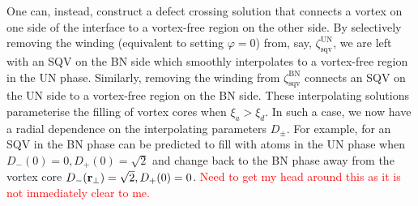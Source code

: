 One can, instead, construct a defect crossing solution that connects a vortex
on one side of the interface to a vortex-free region on the other side.
By selectively removing the winding (equivalent to setting \(\varphi=0\)) from,
say, \(\zeta^\text{UN}_\text{sqv}\), we are left with an SQV on the BN side
which smoothly interpolates to a vortex-free region in the UN phase.
Similarly, removing the winding from \(\zeta^\text{BN}_\text{sqv}\) connects an
SQV on the UN side to a vortex-free region on the BN side.
These interpolating solutions parameterise the filling of vortex cores when
\(\xi_a > \xi_d\).
In such a case, we now have a radial dependence on the interpolating parameters
\(D_{\pm}\).
For example, for an SQV in the BN phase can be predicted to fill with atoms in
the UN phase when \(D_-(0) = 0, D_+(0) = \sqrt{2}\) and change back to the BN
phase away from the vortex core \(D_-(\vb{r}_\perp) = \sqrt{2}, D_+(0) = 0\).
\textcolor{red}{Need to get my head around this as it is not immediately clear
    to me.}

